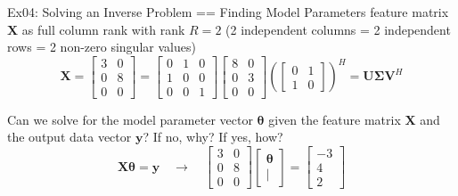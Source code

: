\documentclass[mathserif, aspectratio=1610]{intbeamer}
\begin{document}
\begin{frame}[t]{Ex04: Solving an Inverse Problem == Finding Model Parameters}
feature matrix $\bm{X}$ as full column rank with rank $R=2$ (2 independent columns = 2 independent rows = 2 non-zero singular values)
$$
\bm{X} =
\begin{bmatrix}
3 & 0 \\ 0 & 8 \\ 0 & 0
\end{bmatrix}
=
\begin{bmatrix}
0 & 1 & 0 \\
1 & 0 & 0 \\
0 & 0 & 1
\end{bmatrix}
%
\begin{bmatrix}
8 & 0\\
0 & 3\\
0 & 0
\end{bmatrix}
%
\left(
\begin{bmatrix}
0 & 1\\
1 & 0
\end{bmatrix}
\right)^H=
\bm{U} \bm{\Sigma} \bm{V}^H
$$

Can we solve for the model parameter vector $\bm{\theta}$ given the feature matrix $\bm{X}$ and the output data vector $\bm{y}$?
%
If no, why? If yes, how?
$$
\bm{X} \bm{\theta} = \bm{y}
\quad \rightarrow \quad
\begin{bmatrix}
3 & 0 \\ 0 & 8 \\ 0 & 0
\end{bmatrix}
\begin{bmatrix}
\bm{\theta} \\ |
\end{bmatrix}=
\begin{bmatrix}
-3 \\ 4 \\ 2
\end{bmatrix}
$$

\end{frame}
\end{document}
